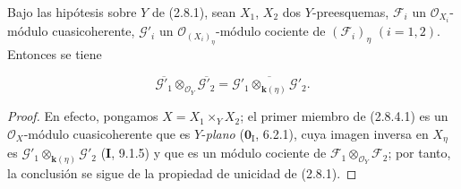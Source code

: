 \begin{proposition}[2.8.4]
\label{IV.2.8.4-fr}
Bajo las hipótesis sobre $Y$ de \textup{(2.8.1)}, sean $X_1$, $X_2$ dos
$Y$-preesquemas, $\mathcal F_i$ un $\mathcal O_{X_i}$-módulo
cuasicoherente, $\mathcal G'_i$ un $\mathcal O_{(X_i)_\eta}$-módulo cociente
de $(\mathcal F_i)_\eta$ $(i=1,2)$. Entonces se tiene
\end{proposition}

\begin{env}[2.8.4.1]
\label{IV.2.8.4.1-fr}
\[
\overline{\mathcal G'_1}\otimes_{\mathcal O_Y}\overline{\mathcal G'_2}
=\overline{\mathcal G'_1\otimes_{\mathbf{k}(\eta)}\mathcal G'_2}.
\]
\end{env}

\begin{proof}
En efecto, pongamos $X=X_1\times_Y X_2$; el primer miembro de (2.8.4.1) es
un $\mathcal O_X$-módulo cuasicoherente que es $Y$-\emph{plano}
($\mathbf{0}_{\mathrm I}$, 6.2.1), cuya imagen inversa en $X_\eta$ es
$\mathcal G'_1\otimes_{\mathbf{k}(\eta)}\mathcal G'_2$ (\textbf I, 9.1.5) y que es un módulo
cociente de $\mathcal F_1\otimes_{\mathcal O_Y}\mathcal F_2$; por tanto, la
conclusión se sigue de la propiedad de unicidad de (2.8.1).
\end{proof}

